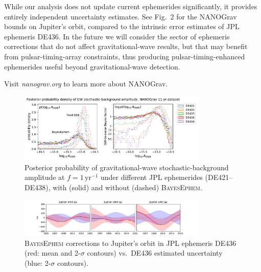 \documentclass[main.tex]{subfiles}
\begin{document}
While our analysis does not update current ephemerides significantly, it provides entirely independent uncertainty estimates. See Fig.\ 2 for the NANOGrav bounds on Jupiter's orbit, compared to the intrinsic error estimates of JPL ephemeris DE436. In the future we will consider the sector of ephemeris corrections that do not affect gravitational-wave results, but that may benefit from pulsar-timing-array constraints, thus producing pulsar-timing-enhanced ephemerides useful beyond gravitational-wave detection.

Visit {\it nanograv.org} to learn more about NANOGrav.

\vspace{12pt}
\begin{figure}[h]
\centering
\includegraphics[width=0.8\textwidth]{GWposterior.pdf}
\caption{Posterior probability of gravitational-wave stochastic-background amplitude at $f=1\,\mathrm{yr}^{-1}$ under different JPL ephemerides (DE421--DE438), with (solid) and without (dashed) \textsc{BayesEphem}.}
\end{figure}

\vspace{12pt}

\begin{figure}[h]
\centering
\includegraphics[width=0.8\textwidth]{orbit-corrections.pdf}
\caption{\textsc{BayesEphem} corrections to Jupiter's orbit in JPL ephemeris DE436 (red: mean and 2-$\sigma$ contours) vs.\ DE436 estimated uncertainty (blue: 2-$\sigma$ contours).}
\end{figure}
\end{document}
